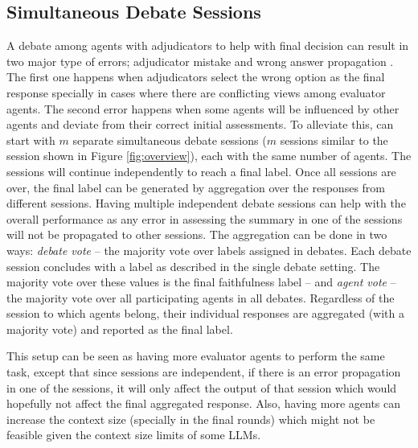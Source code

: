 \subsection{Simultaneous Debate Sessions}\label{app:method}
A debate among agents with adjudicators to help with final decision can result in two major type of errors; adjudicator mistake and wrong answer propagation \cite{wang2024rethinking}. The first one happens when adjudicators select the wrong option as the final response specially in cases where there are conflicting views among evaluator agents. The second error happens when some agents will be influenced by other agents and deviate from their correct initial assessments. 
To alleviate this, \method can start with $m$ separate simultaneous debate sessions ($m$ sessions similar to the session shown in Figure \ref{fig:overview}), each with the same number of agents. The sessions will continue independently to reach a final label. Once all sessions are over, the final label can be generated by aggregation over the responses from different sessions.
Having multiple independent debate sessions can help with the overall performance as any error in assessing the summary in one of the sessions will not be propagated to other sessions.
% 
The aggregation can be done in two ways: \emph{debate vote} -- the majority vote over labels assigned in debates. Each debate session concludes with a label as described in the single debate setting.
The majority vote over these values is the final faithfulness label -- and \emph{agent vote} -- the majority vote over all participating agents in all debates. Regardless of the session to which agents belong, their individual responses are aggregated (with a majority vote) and reported as the final label.

This setup can be seen as having more evaluator agents to perform the same task, except that since sessions are independent, if there is an error propagation in one of the sessions, it will only affect the output of that session which would hopefully not affect the final aggregated response.
Also, having more agents can increase the context size (specially in the final rounds) which might not be feasible given the context size limits of some LLMs.
% 
